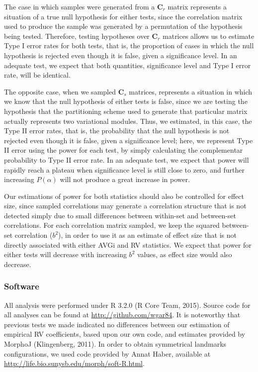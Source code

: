 \documentclass[11pt,twoside]{report}
\begin{document}
The case in which samples were generated from a $\mathbf{C}_r$ matrix
represents a situation of a true null hypothesis for either tests, since
the correlation matrix used to produce the sample was generated by a
permutation of the hypothesis being tested. Therefore, testing
hypotheses over $\mathbf{C}_r$ matrices allows us to estimate Type I
error rates for both tests, that is, the proportion of cases in which
the null hypothesis is rejected even though it is false, given a
significance level. In an adequate test, we expect that both quantities,
significance level and Type I error rate, will be identical.

The opposite case, when we sampled $\mathbf{C}_s$ matrices, represents a
situation in which we know that the null hypothesis of either tests is
false, since we are testing the hypothesis that the partitioning scheme
used to generate that particular matrix actually represents two
variational modules. Thus, we estimated, in this case, the Type II error
rates, that is, the probability that the null hypothesis is not rejected
even though it is false, given a significance level; here, we represent
Type II error using the power for each test, by simply calculating the
complementar probability to Type II error rate. In an adequate test, we
expect that power will rapidly reach a plateau when significance level
is still close to zero, and further increasing $P(\alpha)$ will not
produce a great increase in power.

Our estimations of power for both statistics should also be controlled
for effect size, since sampled correlations may generate a correlation
structure that is not detected simply due to small differences between
within-set and between-set correlations. For each correlation matrix
sampled, we keep the squared between-set correlation ($b^2$), in order
to use it as an estimate of effect size that is not directly associated
with either AVGi and RV statistics. We expect that power for either
tests will decrease with increasing $b^2$ values, as effect size would
also decrease.

\subsubsection{Software}\label{software}

All analysis were performed under R 3.2.0 (R Core Team, 2015). Source
code for all analyses can be found at \url{http://github.com/wgar84}. It
is noteworthy that previous tests we made indicated no differences
between our estimation of empirical RV coefficients, based upon our own
code, and estimates provided by MorphoJ (Klingenberg, 2011). In order to
obtain symmetrical landmarks configurations, we used code provided by
Annat Haber, available at
\url{http://life.bio.sunysb.edu/morph/soft-R.html}.
\end{document}
